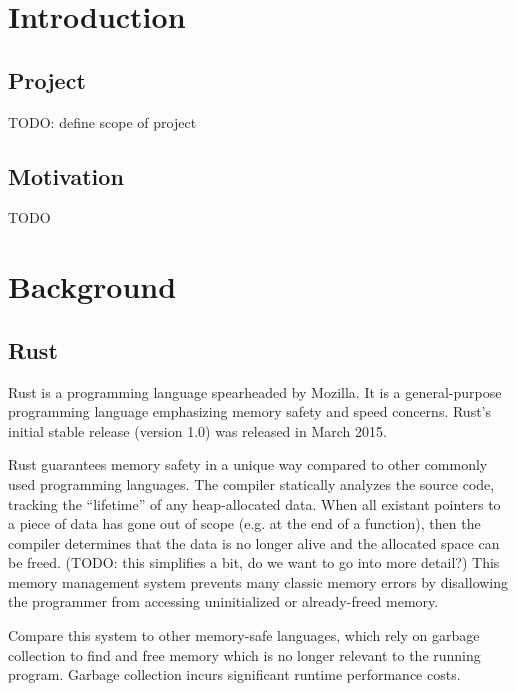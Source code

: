\documentclass{article}
\begin{document}
\begin{multicols}{2}

\section{Introduction}

\subsection{Project}

TODO: define scope of project

\subsection{Motivation}

TODO

\section{Background}

\subsection{Rust}

Rust is a programming language spearheaded by Mozilla. It is a
general-purpose programming language emphasizing memory safety and speed
concerns. Rust's initial stable release (version 1.0) was released in March
2015. \newline

Rust guarantees memory safety in a unique way compared to other commonly used
programming languages. The compiler statically analyzes the source code,
tracking the ``lifetime'' of any heap-allocated data. When all existant pointers
to a piece of data has gone out of scope (e.g. at the end of a function), then
the compiler determines that the data is no longer alive and the allocated space
can be freed. (TODO: this simplifies a bit, do we want to go into more detail?)
This memory management system prevents many classic memory errors by disallowing
the programmer from accessing uninitialized or already-freed memory. \newline

Compare this system to other memory-safe languages, which rely on garbage
collection to find and free memory which is no longer relevant to the running
program. Garbage collection incurs significant runtime performance costs.
\newline


\end{multicols}
\end{document}
